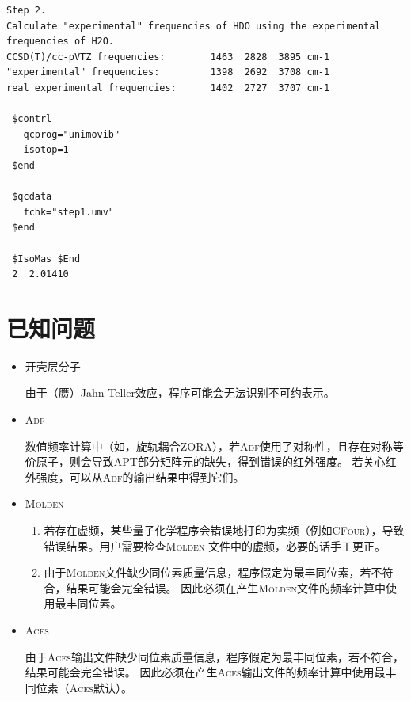 \documentclass[12pt,a4paper,openany,twoside,cap]{ctexbook}
\begin{document}
\begin{colorboxed}[oval=false,boxcolor=green!75!black,bgcolor=green!5!white]
\ttfamily\footnotesize
\begin{lstlisting}
Step 2.
Calculate "experimental" frequencies of HDO using the experimental frequencies of H2O.
CCSD(T)/cc-pVTZ frequencies:        1463  2828  3895 cm-1
"experimental" frequencies:         1398  2692  3708 cm-1
real experimental frequencies:      1402  2727  3707 cm-1

 $contrl
   qcprog="unimovib"
   isotop=1
 $end

 $qcdata
   fchk="step1.umv"
 $end

 $IsoMas $End
 2  2.01410
\end{lstlisting}\end{colorboxed}


\chapter{已知问题} \label{part:problem}

\begin{itemize}
\item 开壳层分子

由于（赝）Jahn-Teller效应，程序可能会无法识别不可约表示。

\item \textsc{Adf}

数值频率计算中（如，旋轨耦合ZORA），若\textsc{Adf}使用了对称性，且存在对称等价原子，则会导致APT部分矩阵元的缺失，得到错误的红外强度。
若关心红外强度，可以从\textsc{Adf}的输出结果中得到它们。

\item \textsc{Molden}

\begin{enumerate}
\item 若存在虚频，某些量子化学程序会错误地打印为实频（例如\textsc{CFour}），导致错误结果。用户需要检查\textsc{Molden}
文件中的虚频，必要的话手工更正。

\item 由于\textsc{Molden}文件缺少同位素质量信息，程序假定为最丰同位素，若不符合，结果可能会完全错误。
因此必须在产生\textsc{Molden}文件的频率计算中使用最丰同位素。
\end{enumerate}

\item \textsc{Aces}

由于\textsc{Aces}输出文件缺少同位素质量信息，程序假定为最丰同位素，若不符合，结果可能会完全错误。
因此必须在产生\textsc{Aces}输出文件的频率计算中使用最丰同位素（\textsc{Aces}默认）。

\end{itemize}
\end{document}
